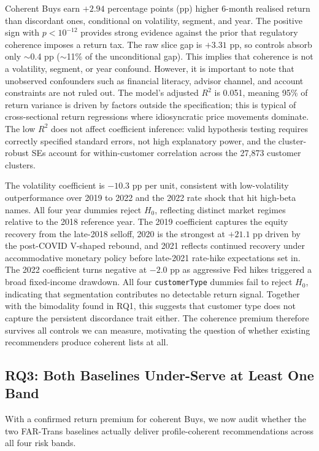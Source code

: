 Coherent Buys earn $+2.94$ percentage points (pp) higher 6-month realised return than discordant ones, conditional on volatility, segment, and year. The positive sign with $p < 10^{-12}$ provides strong evidence against the prior that regulatory coherence imposes a return tax. The raw slice gap is $+3.31$ pp, so controls absorb only $\sim$0.4 pp ($\sim$11\% of the unconditional gap). This implies that coherence is not a volatility, segment, or year confound. However, it is important to note that unobserved confounders such as financial literacy, advisor channel, and account constraints are not ruled out. The model's adjusted $R^2$ is 0.051, meaning 95\% of return variance is driven by factors outside the specification; this is typical of cross-sectional return regressions where idiosyncratic price movements dominate. The low $R^2$ does not affect coefficient inference: valid hypothesis testing requires correctly specified standard errors, not high explanatory power, and the cluster-robust SEs account for within-customer correlation across the 27{,}873 customer clusters.

The volatility coefficient is $-10.3$ pp per unit, consistent with low-volatility outperformance over 2019 to 2022 and the 2022 rate shock that hit high-beta names. All four year dummies reject $H_0$, reflecting distinct market regimes relative to the 2018 reference year. The 2019 coefficient captures the equity recovery from the late-2018 selloff, 2020 is the strongest at $+21.1$ pp driven by the post-COVID V-shaped rebound, and 2021 reflects continued recovery under accommodative monetary policy before late-2021 rate-hike expectations set in. The 2022 coefficient turns negative at $-2.0$ pp as aggressive Fed hikes triggered a broad fixed-income drawdown. All four \texttt{customerType} dummies fail to reject $H_0$, indicating that segmentation contributes no detectable return signal. Together with the bimodality found in RQ1, this suggests that customer type does not capture the persistent discordance trait either. The coherence premium therefore survives all controls we can measure, motivating the question of whether existing recommenders produce coherent lists at all.

\subsection{RQ3: Both Baselines Under-Serve at Least One Band}
\label{sec:results:rq3}

With a confirmed return premium for coherent Buys, we now audit whether the two FAR-Trans baselines actually deliver profile-coherent recommendations across all four risk bands.

